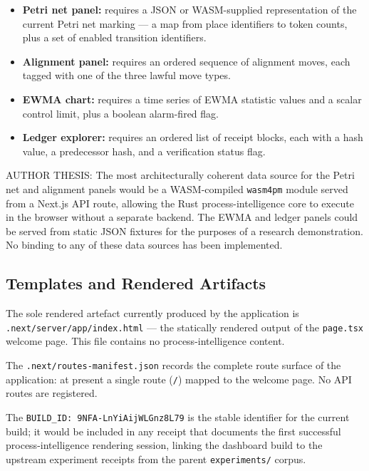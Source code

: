 \begin{itemize}
  \item \textbf{Petri net panel:} requires a JSON or WASM-supplied representation of the
        current Petri net marking --- a map from place identifiers to token counts, plus a
        set of enabled transition identifiers.
  \item \textbf{Alignment panel:} requires an ordered sequence of alignment moves, each
        tagged with one of the three lawful move types.
  \item \textbf{EWMA chart:} requires a time series of EWMA statistic values and a scalar
        control limit, plus a boolean alarm-fired flag.
  \item \textbf{Ledger explorer:} requires an ordered list of receipt blocks, each with a
        hash value, a predecessor hash, and a verification status flag.
\end{itemize}

AUTHOR THESIS: The most architecturally coherent data source for the Petri net and alignment
panels would be a WASM-compiled \texttt{wasm4pm} module served from a Next.js API route,
allowing the Rust process-intelligence core to execute in the browser without a separate
backend. The EWMA and ledger panels could be served from static JSON fixtures for the
purposes of a research demonstration. No binding to any of these data sources has been
implemented.

\subsection{Templates and Rendered Artifacts}
\label{sec:experiments-visualizer-nextjs-impl-rendered}

The sole rendered artefact currently produced by the application is
\texttt{.next/server/app/index.html} --- the statically rendered output of the
\texttt{page.tsx} welcome page. This file contains no process-intelligence content.

The \texttt{.next/routes-manifest.json} records the complete route surface of the application:
at present a single route (\texttt{/}) mapped to the welcome page. No API routes are
registered.

The \texttt{BUILD\_ID: 9NFA-LnYiAijWLGnz8L79} is the stable identifier for the current
build; it would be included in any receipt that documents the first successful
process-intelligence rendering session, linking the dashboard build to the upstream
experiment receipts from the parent \texttt{experiments/} corpus.
